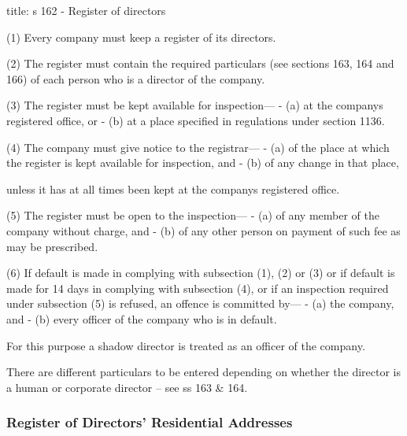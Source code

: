 \documentclass[
]{article}
\newenvironment{Shaded}{}{}
\newcommand{\NormalTok}[1]{#1}
\begin{document}
\begin{Shaded}
\begin{Highlighting}[]
\NormalTok{title: s 162 {-} Register of directors}

\NormalTok{(1) Every company must keep a register of its directors.}

\NormalTok{(2) The register must contain the required particulars (see sections 163, 164 and 166) of each person who is a director of the company.}

\NormalTok{(3) The register must be kept available for inspection—}
\NormalTok{{-} (a) at the company\textquotesingle{}s registered office, or}
\NormalTok{{-} (b) at a place specified in regulations under section 1136.}

\NormalTok{(4) The company must give notice to the registrar—}
\NormalTok{{-} (a) of the place at which the register is kept available for inspection, and}
\NormalTok{{-} (b) of any change in that place,}

\NormalTok{unless it has at all times been kept at the company\textquotesingle{}s registered office.}

\NormalTok{(5) The register must be open to the inspection—}
\NormalTok{{-} (a) of any member of the company without charge, and}
\NormalTok{{-} (b) of any other person on payment of such fee as may be prescribed.}

\NormalTok{(6) If default is made in complying with subsection (1), (2) or (3) or if default is made for 14 days in complying with subsection (4), or if an inspection required under subsection (5) is refused, an offence is committed by—}
\NormalTok{{-} (a) the company, and}
\NormalTok{{-} (b) every officer of the company who is in default.}

\NormalTok{For this purpose a shadow director is treated as an officer of the company. }
\end{Highlighting}
\end{Shaded}

There are different particulars to be entered depending on whether the
director is a human or corporate director -- see ss 163 \& 164.

\hypertarget{register-of-directors-residential-addresses}{%
\subsubsection{Register of Directors' Residential
Addresses}\label{register-of-directors-residential-addresses}}
\end{document}

